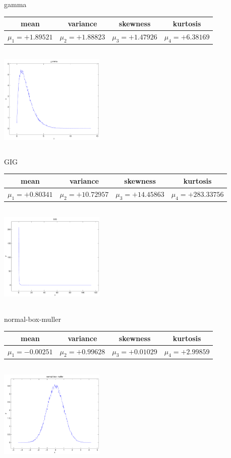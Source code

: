 \documentclass[9pt]{article}
\theoremstyle{plain}
\theoremstyle{definition}
\theoremstyle{remark}
\numberwithin{equation}{section}
\begin{document}
\newpage
gamma \begin{tabular}{|c|c|c|c|}  mean & variance & skewness & kurtosis \\  \hline
$\mu_1 = +1.89521$ & $\mu_2 = +1.88823$ & $\mu_3 = +1.47926$ & $\mu_4 =+6.38169$ \\
\end{tabular}

\includegraphics[width=5cm,height=5cm]{gamma.pdf}

GIG \begin{tabular}{|c|c|c|c|}  mean & variance & skewness & kurtosis \\  \hline
$\mu_1 = +0.80341$ & $\mu_2 = +10.72957$ & $\mu_3 = +14.45863$ & $\mu_4 =+283.33756$ \\
\end{tabular}

\includegraphics[width=5cm,height=5cm]{GIG.pdf}

normal-box-muller \begin{tabular}{|c|c|c|c|}  mean & variance & skewness & kurtosis \\  \hline
$\mu_1 = -0.00251$ & $\mu_2 = +0.99628$ & $\mu_3 = +0.01029$ & $\mu_4 =+2.99859$ \\
\end{tabular}

\includegraphics[width=5cm,height=5cm]{normal-box-muller.pdf}
\end{document}
